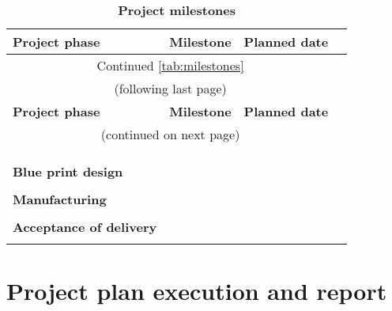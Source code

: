 \renewcommand\arraystretch{1.0}
\begin{longtable}{|m{4cm}<{\centering}|m{6cm}<{\centering}|m{4cm}<{\centering}|}
\caption{\textbf{Project milestones}}
\label{tab:milestones}\\
\toprule
\textbf{Project phase} & \textbf{Milestone} & \textbf{Planned date} \\
\midrule
\endfirsthead
\multicolumn{3}{c}{Continued \autoref{tab:milestones}}\\
\multicolumn{3}{c}{(following last page)}\\
\toprule
\textbf{Project phase} & \textbf{Milestone} & \textbf{Planned date} \\
\midrule
\endhead
\bottomrule
\multicolumn{3}{c}{(continued on next page)}
\endfoot
\bottomrule
\endlastfoot

\multirow{3}{*}{\bfseries \footnotesize Project preparation} &   &   \\
\cline{2-3}
                         &   &   \\
\cline{2-3}
                         &   &   \\
\cline{2-3}
                         &   &   \\
\midrule
\multirow{3}{*}{\bfseries \footnotesize Blue print design} &   &   \\ 
\cline{2-3}
                         &   &   \\
\cline{2-3}
                         &   &   \\
\cline{2-3}
                         &   &   \\
\midrule
\multirow{3}{*}{\bfseries \footnotesize Manufacturing} &   &   \\
\cline{2-3}
                         &   &   \\
\cline{2-3}
                         &   &   \\
\cline{2-3}
                         &   &   \\
\midrule
\multirow{3}{*}{\bfseries \footnotesize Acceptance of delivery} &   &   \\ 
\cline{2-3}
                         &   &   \\
\cline{2-3}
                         &   &   \\
\cline{2-3}
                         &   &   \\

\end{longtable}

\section{Project plan execution and report}

